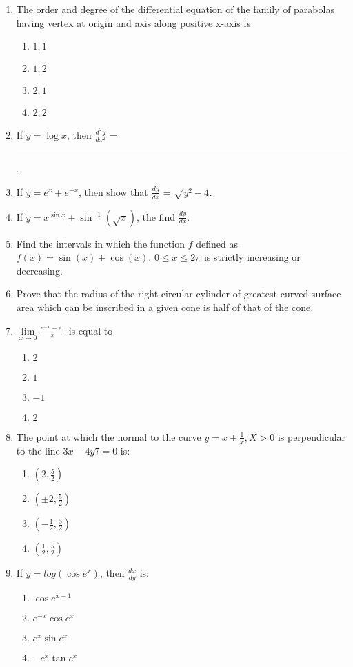 \begin{enumerate}
\item The order and degree of the differential equation of the family of parabolas having vertex at origin and axis along positive x-axis is
\begin{enumerate}
    \item $1,1$
    \item $1,2$
    \item $2,1$
    \item $2,2$
\end{enumerate}
\item If $y = \log x$, then $\frac{d^2y}{dx^2}$ =  \rule{30pt}{1pt}.
\item If $y = e^x + e^{-x}$, then show that $\frac{dy}{dx}$ = $\sqrt{y^2 - 4}$.

\item If $y=x^{\sin x }+\sin^{-1}(\sqrt x)$, the find $\frac{dy}{dx}$.
\item Find the intervals in which the function $f$ defined as $f(x) = \sin(x) + \cos(x)$, $0 \leq x \leq 2\pi$ is strictly increasing or decreasing.
\item Prove that the radius of the right circular cylinder of greatest curved surface area which can be inscribed in a given cone is half of that of the cone. 
\item $\lim\limits_{x \to 0}{\frac{e^{-x} - e^x}{x}}$ is equal to
\begin{enumerate}
    \item $2$
    \item $1$
    \item $-1$
    \item $2$
\end{enumerate}


\item The point at which the normal to the curve $ y = x + \frac{1}{x}, X > 0$ is perpendicular to the line $3x - 4y 7 = 0$ is:
	\begin{enumerate}
	\item $(2, \frac{5}{2})$
	\item $(\pm2, \frac{5}{2})$
      	\item $(-\frac{1}{2}, \frac{5}{2})$
      	\item $(\frac{1}{2}, \frac{5}{2})$
  	\end{enumerate}

\item If $y = log(\cos e^x)$, then $\frac{dx}{dy}$ is: 
   
	\begin{enumerate}
	\item $ \cos e^{x-1} $
	\item $ e^{-x} \cos e^x $
      	\item $ e^x \sin e^x $
      	\item $ -e^x \tan e^x $
  	\end{enumerate}


\end{enumerate}
